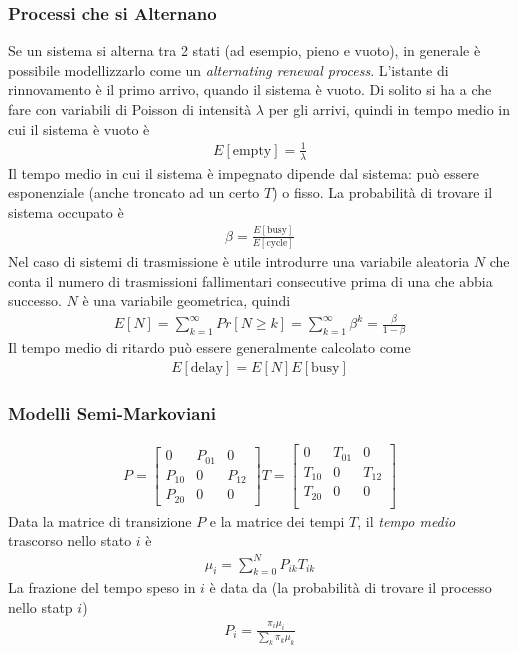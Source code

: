 \documentclass{article}
\begin{document}
\subsubsection{Processi che si Alternano}
Se un sistema si alterna tra 2 stati (ad esempio, pieno e vuoto), in generale è possibile modellizzarlo come un \emph{alternating renewal process}.
L'istante di rinnovamento è il primo arrivo, quando il sistema è vuoto.
Di solito si ha a che fare con variabili di Poisson di intensità $\lambda$ per gli arrivi, quindi in tempo medio in cui il sistema è vuoto è
\begin{align*}
E[\text{empty}] = \frac{1}{\lambda}
\end{align*}
Il tempo medio in cui il sistema è impegnato dipende dal sistema: può essere esponenziale (anche troncato ad un certo $T$) o fisso.
La probabilità di trovare il sistema occupato è
\begin{gather}
\beta = \frac{E[\text{busy}]}{E[\text{cycle}]}
\end{gather}
Nel caso di sistemi di trasmissione è utile introdurre una variabile aleatoria $N$ che conta il numero di trasmissioni fallimentari consecutive prima di una che abbia successo.
$N$ è una variabile geometrica, quindi
\begin{gather*}
E[N] = \sum_{k=1}^{\infty} Pr[N\ge k] = \sum_{k=1}^{\infty} \beta^k = \frac{\beta}{1 - \beta}
\end{gather*}
Il tempo medio di ritardo può essere generalmente calcolato come
\begin{gather*}
E[\text{delay}] = E[N]E[\text{busy}]
\end{gather*}

\subsubsection{Modelli Semi-Markoviani}
\begin{align*}
P = \left[\begin{array}{ccc}
0 & P_{01} & 0\\
P_{10} & 0 & P_{12}\\
P_{20} & 0 & 0
\end{array}\right]
T = \left[\begin{array}{ccc}
0 & T_{01} & 0\\
T_{10} & 0 & T_{12}\\
T_{20} & 0 & 0\\
\end{array}\right]
\end{align*}
Data la matrice di transizione $P$ e la matrice dei tempi $T$, il \emph{tempo medio} trascorso nello stato $i$ è
\begin{align*}
\mu_i = \sum_{k=0}^N P_{ik}T_{ik}
\end{align*}
La frazione del tempo speso in $i$ è data da (la probabilità di trovare il processo nello statp $i$)
\begin{align*}
P_i = \frac{\pi_i \mu_i}{\sum_k \pi_k \mu_k}
\end{align*}
\end{document}
